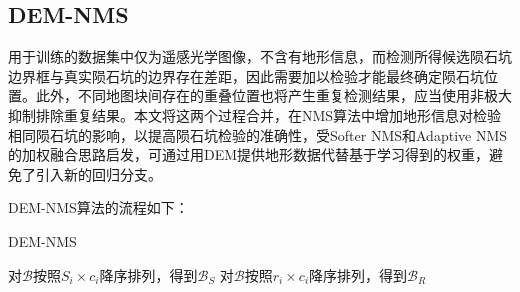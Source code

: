 \subsection{DEM-NMS}
用于训练的数据集中仅为遥感光学图像，不含有地形信息，而检测所得候选陨石坑边界框与真实陨石坑的边界存在差距，因此需要加以检验才能最终确定陨石坑位置。此外，不同地图块间存在的重叠位置也将产生重复检测结果，应当使用非极大抑制排除重复结果。本文将这两个过程合并，在NMS算法中增加地形信息对检验相同陨石坑的影响，以提高陨石坑检验的准确性，受Softer NMS\cite{heSofterNMSRethinkingBounding2018}和Adaptive NMS\cite{liuAdaptiveNMSRefining2019}的加权融合思路启发，可通过用DEM提供地形数据代替基于学习得到的权重，避免了引入新的回归分支。

DEM-NMS算法的流程如下：\par

\begin{algorithm}[H]
  \caption{DEM-NMS}
  对$\mathcal{B}$按照$S_i\times c_i$降序排列，得到$\mathcal{B}_S$\;
  对$\mathcal{B}$按照$r_i\times c_i$降序排列，得到$\mathcal{B}_R$\;
\end{algorithm}
